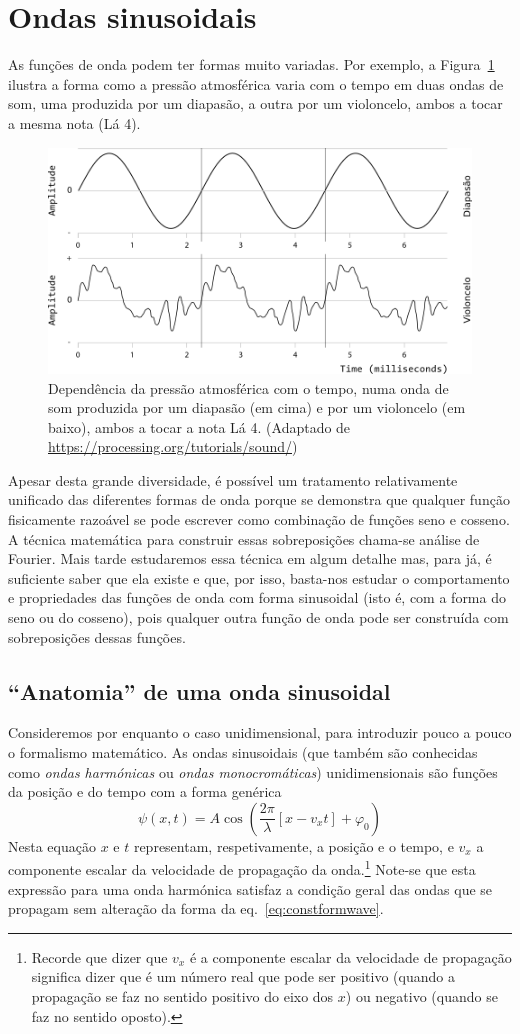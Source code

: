 \section{Ondas sinusoidais}\label{sec:hamonicwaves}
As funções de onda podem ter formas muito variadas. Por exemplo, a
Figura~\ref{fig:20-cello} ilustra a forma como a pressão atmosférica varia com o
tempo em duas ondas de som, uma produzida por um diapasão, a outra por um
violoncelo, ambos a tocar a mesma nota (Lá 4).
\begin{figure}[htb]
{\centering
\includegraphics[width=0.5\linewidth]{figs/f20-cello.png}\par
}
\caption{Dependência da pressão atmosférica com o tempo, numa onda de som
produzida por um diapasão (em cima) e por um violoncelo (em baixo), ambos a
tocar a nota Lá 4. (Adaptado de
\protect\url{https://processing.org/tutorials/sound/})\label{fig:20-cello}}
\end{figure}
Apesar desta grande diversidade, é possível um tratamento relativamente
unificado das diferentes formas de onda porque se demonstra que qualquer função
fisicamente razoável se pode escrever como combinação de funções seno e cosseno.
A técnica matemática para construir essas sobreposições chama-se análise de
Fourier. Mais tarde estudaremos essa técnica em algum detalhe mas, para já, é
suficiente saber que ela existe e que, por isso, basta-nos estudar o
comportamento e propriedades das funções de onda com forma sinusoidal (isto é,
com a forma do seno ou do cosseno), pois qualquer outra função de onda pode ser
construída com sobreposições dessas funções.

\subsection{``Anatomia'' de uma onda sinusoidal}
Consideremos por enquanto o caso unidimensional, para introduzir pouco a pouco o
formalismo matemático. As ondas sinusoidais (que também são conhecidas como
\emph{ondas harmónicas} ou \emph{ondas monocro\-máticas}) unidimensionais são
funções da posição e do tempo com a forma genérica
\begin{equation}\label{eq:hwav}
    \psi(x,t)=A\cos\left(\frac{2\pi}{\lambda}\left[x-v_xt\right]+
            \varphi_0\right)
\end{equation}
Nesta equação $x$ e $t$ representam, respetivamente, a posição e o tempo, e
$v_x$ a componente escalar da velocidade de propagação da onda.\footnote{Recorde
que dizer que $v_x$ é a componente escalar da velocidade de propagação significa
dizer que é um número real que pode ser positivo (quando a propagação se faz no
sentido positivo do eixo dos $x$) ou negativo (quando se faz no sentido
oposto).}
Note-se que esta expressão para uma onda harmónica satisfaz a condição geral das
ondas que se propagam sem alteração da forma da eq.~\eqref{eq:constformwave}.

